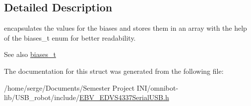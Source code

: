 \subsection{Detailed Description}
encapsulates the values for the biases and stores them in an array with the help of the biases\+\_\+t enum for better readability. 

\begin{DoxySeeAlso}{See also}
\hyperlink{_e_b_v___e_d_v_s4337_serial_u_s_b_8h_a0580b5f9d6ec67f7bb47b4f52cff0cfd}{biases\+\_\+t} 
\end{DoxySeeAlso}


The documentation for this struct was generated from the following file\+:\begin{DoxyCompactItemize}
\item 
/home/serge/\+Documents/\+Semester Project I\+N\+I/omnibot-\/lib/\+U\+S\+B\+\_\+robot/include/\hyperlink{_e_b_v___e_d_v_s4337_serial_u_s_b_8h}{E\+B\+V\+\_\+\+E\+D\+V\+S4337\+Serial\+U\+S\+B.\+h}\end{DoxyCompactItemize}
